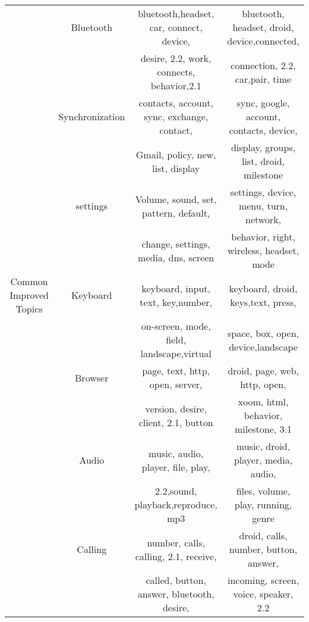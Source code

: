 \documentclass[10pt, conference, compsocconf]{IEEEtran}
\begin{document}
\begin{table*}[!htb]
\begin{tabular}{|c||c||c||c|}
  & Bluetooth & bluetooth,headset, car, connect, device,  &bluetooth,	headset, droid, device,connected, \\
            &&desire,	2.2, work, connects, behavior,2.1 &connection, 2.2, car,pair, time\\ \cline{2-4}
            
  & Synchronization&contacts, account, sync, exchange, contact, &sync, google, account, contacts, device, \\
            &&Gmail, policy, new, list, display&display, groups,  list,  droid, milestone\\ \cline{2-4}
            
  & settings&Volume, sound,	set, pattern,  default,&settings, device, menu, turn,	network, \\
            && change, settings, media, dns, screen &behavior,	right, wireless, headset, mode\\
\hline

Common Improved Topics & Keyboard &keyboard, input,	text, key,number,&keyboard, droid, keys,text, press, \\
           && on-screen, mode, field,
landscape,virtual &space, box, open, device,landscape\\ \cline{2-4}
           
    &Browser& page, text, http, open, server,&droid, page, web, http, open, \\
           && version, desire, client, 2.1, button  &xoom, html, behavior, milestone, 3.1 \\ \cline{2-4}
           
               &Audio& music, audio, player, file, play, &music, droid, player, media, audio,  \\
           &&2.2,sound, playback,reproduce, mp3 &files, volume, play, running, genre\\ \cline{2-4}
           
               &Calling& number, calls, calling, 2.1, receive, &droid, calls, number, button, answer,  \\
           && called, button, answer, bluetooth, desire,  &incoming, screen, voice, speaker, 2.2 \\ \cline{2-4}
           

\end{tabular}
\end{table*}
\end{document}
